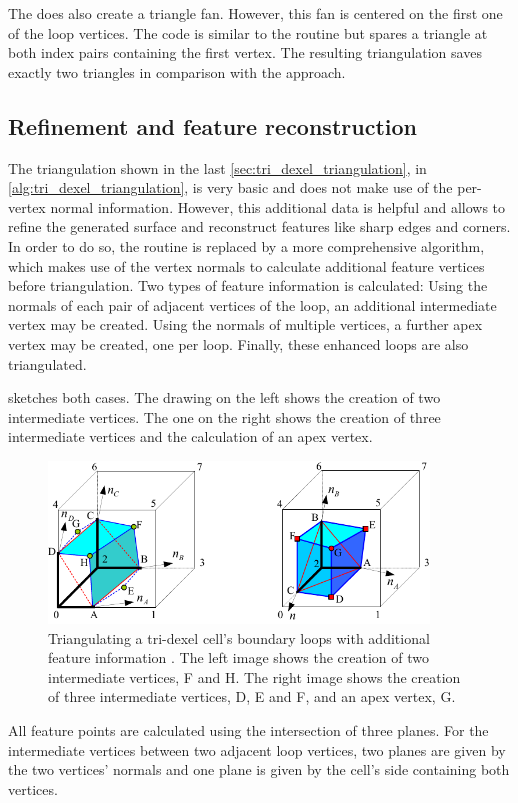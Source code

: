 The  does also create a triangle fan.
However, this fan is centered on the first one of the loop vertices.
The code is similar to the  routine but spares a triangle at both index pairs containing the first vertex.
The resulting triangulation saves exactly two triangles in comparison with the  approach.


\subsection{Refinement and feature reconstruction}
\label{sec:tri_dexel_refinement}

The triangulation shown in the last \cref{sec:tri_dexel_triangulation},  in \cref{alg:tri_dexel_triangulation}, is very basic and does not make use of the per-vertex normal information.
However, this additional data is helpful and allows to refine the generated surface and reconstruct features like sharp edges and corners.
In order to do so, the  routine is replaced by a more comprehensive algorithm, which makes use of the vertex normals to calculate additional feature vertices before triangulation.
Two types of feature information is calculated:
Using the normals of each pair of adjacent vertices of the loop, an additional intermediate vertex may be created.
Using the normals of multiple vertices, a further apex vertex may be created, one per loop.
Finally, these enhanced loops are also triangulated.

 sketches both cases.
The drawing on the left shows the creation of two intermediate vertices.
The one on the right shows the creation of three intermediate vertices and the calculation of an apex vertex.
%
\begin{figure}
	\centering
	\includegraphics[width=0.9\textwidth]{images/tri_dexel_refinement}
	\caption{
		Triangulating a tri-dexel cell's boundary loops with additional feature information \cite{tridexel_reconstruction}.
		The left image shows the creation of two intermediate vertices, F and H.
		The right image shows the creation of three intermediate vertices, D, E and F, and an apex vertex, G.
	}
	\label{fig:tri_dexel_refinement}
\end{figure}
%
All feature points are calculated using the intersection of three planes.
For the intermediate vertices between two adjacent loop vertices, two planes are given by the two vertices' normals and one plane is given by the cell's side containing both vertices.

